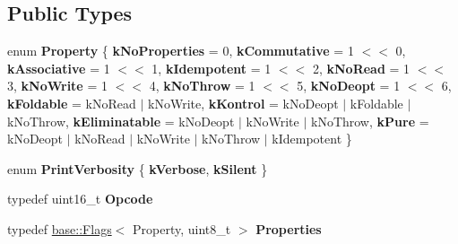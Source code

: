 \subsection*{Public Types}
\begin{DoxyCompactItemize}
\item 
\mbox{\label{classv8_1_1internal_1_1compiler_1_1Operator_a46a45dbac84017b87c0432803df4c3ef}} 
enum {\bfseries Property} \{ \newline
{\bfseries k\+No\+Properties} = 0, 
{\bfseries k\+Commutative} = 1 $<$$<$ 0, 
{\bfseries k\+Associative} = 1 $<$$<$ 1, 
{\bfseries k\+Idempotent} = 1 $<$$<$ 2, 
\newline
{\bfseries k\+No\+Read} = 1 $<$$<$ 3, 
{\bfseries k\+No\+Write} = 1 $<$$<$ 4, 
{\bfseries k\+No\+Throw} = 1 $<$$<$ 5, 
{\bfseries k\+No\+Deopt} = 1 $<$$<$ 6, 
\newline
{\bfseries k\+Foldable} = k\+No\+Read $\vert$ k\+No\+Write, 
{\bfseries k\+Kontrol} = k\+No\+Deopt $\vert$ k\+Foldable $\vert$ k\+No\+Throw, 
{\bfseries k\+Eliminatable} = k\+No\+Deopt $\vert$ k\+No\+Write $\vert$ k\+No\+Throw, 
{\bfseries k\+Pure} = k\+No\+Deopt $\vert$ k\+No\+Read $\vert$ k\+No\+Write $\vert$ k\+No\+Throw $\vert$ k\+Idempotent
 \}
\item 
\mbox{\label{classv8_1_1internal_1_1compiler_1_1Operator_a495a153a5eb0d9b4e6a92cd2af251ca4}} 
enum {\bfseries Print\+Verbosity} \{ {\bfseries k\+Verbose}, 
{\bfseries k\+Silent}
 \}
\item 
\mbox{\label{classv8_1_1internal_1_1compiler_1_1Operator_a724184f5fca57dc0399824a2aa482f8d}} 
typedef uint16\+\_\+t {\bfseries Opcode}
\item 
\mbox{\label{classv8_1_1internal_1_1compiler_1_1Operator_a55dce20c11e09a5294d6bfdceb9ababa}} 
typedef \mbox{\hyperlink{classv8_1_1base_1_1Flags}{base\+::\+Flags}}$<$ Property, uint8\+\_\+t $>$ {\bfseries Properties}
\end{DoxyCompactItemize}
